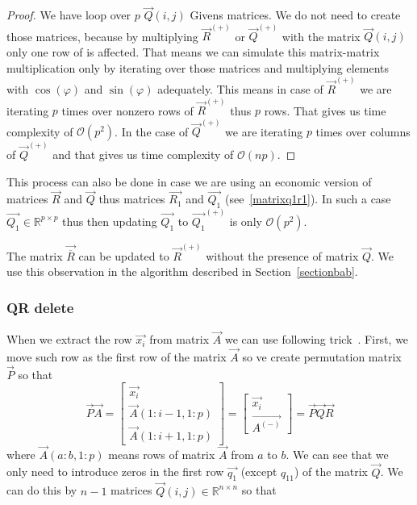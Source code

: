 \begin{proof} \label{qrinsertproof}
We have loop over $p$ $\vec{Q}(i,j)$ Givens matrices. We do not need to create those matrices, because by multiplying $\vec{R}^{(+)}$ or $\vec{Q}^{(+)}$ with the matrix $\vec{Q}(i,j)$ only one row of is affected. That means we can simulate this matrix-matrix multiplication only by iterating over those matrices and multiplying elements with $\cos(\varphi)$ and $\sin(\varphi)$ adequately. This means in case of $\vec{R}^{(+)}$ we are iterating $p$ times over nonzero rows of $\vec{R}^{(+)}$ thus $p$ rows. That gives us time complexity of $\mathcal{O}(p^2)$. In the case of $\vec{Q}^{(+)}$  we are iterating $p$ times over columns of $\vec{Q}^{(+)}$ and that gives us time complexity of $\mathcal{O}(np)$.
\end{proof}

\begin{note}
This process can also be done in case we are using an economic version of matrices $\vec{R}$ and $\vec{Q}$  thus matrices $\vec{R_1}$ and $\vec{Q_1}$ (see~\eqref{matrixq1r1}). In such a case
$\vec{Q_1} \in \mathbb{R}^{p \times p}$ thus then updating $\vec{Q_1}$ to $\vec{Q_1}^{(+)}$ is only $\mathcal{O}(p^2)$.
\end{note}

\begin{note} \label{qnotrequired}
The matrix $\vec{\overline{R}}$  can be updated to $\vec{R}^{(+)}$  without the presence of matrix $\vec{Q}$. We use this observation  in the algorithm described in Section~\ref{sectionbab}.
\end{note}




\subsubsection*{QR delete}
When we extract the row $\vec{x_i}$ from matrix $\vec{A}$ we can use following trick~\cite{hammarling2008updatingqr}. First, we move such row as the first row of the matrix $\vec{A}$ so ve create permutation matrix $\vec{P}$ so that 
\begin{equation}
    \vec{P}\vec{A} = \begin{bmatrix}
        \vec{x_i} \\
        \vec{A}(1:i-1 , 1:p) \\
        \vec{A}(1:i+1 , 1:p) 
    \end{bmatrix}
    = 
    \begin{bmatrix}
        \vec{x_i} \\
        \vec{A^{(-)}}
    \end{bmatrix}
    = \vec{P}\vec{Q}\vec{R}
\end{equation} 
where $\vec{A}(a:b , 1:p) $ means rows of matrix $\vec{A}$ from $a$ to $b$.
We can see that we only need to introduce zeros in the first row $\vec{q_1}$ (except $q_{11}$) of the matrix $\vec{Q}$. We can do this by $n-1$ matrices $\vec{Q}(i,j) \in \mathbb{R}^{n \times n}$ so that


